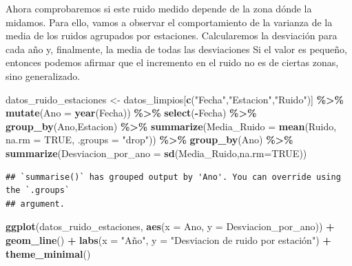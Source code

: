 \documentclass[notspecified,article,submit,moreauthors,pdftex]{Definitions/mdpi}
\newenvironment{Shaded}{\begin{snugshade}}{\end{snugshade}}
\newcommand{\AttributeTok}[1]{\textcolor[rgb]{0.13,0.29,0.53}{#1}}
\newcommand{\ConstantTok}[1]{\textcolor[rgb]{0.56,0.35,0.01}{#1}}
\newcommand{\FunctionTok}[1]{\textcolor[rgb]{0.13,0.29,0.53}{\textbf{#1}}}
\newcommand{\NormalTok}[1]{#1}
\newcommand{\OtherTok}[1]{\textcolor[rgb]{0.56,0.35,0.01}{#1}}
\newcommand{\SpecialCharTok}[1]{\textcolor[rgb]{0.81,0.36,0.00}{\textbf{#1}}}
\newcommand{\StringTok}[1]{\textcolor[rgb]{0.31,0.60,0.02}{#1}}
\begin{document}
Ahora comprobaremos si este ruido medido depende de la zona dónde la
midamos. Para ello, vamos a observar el comportamiento de la varianza de
la media de los ruidos agrupados por estaciones. Calcularemos la
desviación para cada año y, finalmente, la media de todas las
desviaciones Si el valor es pequeño, entonces podemos afirmar que el
incremento en el ruido no es de ciertas zonas, sino generalizado.

\begin{Shaded}
\begin{Highlighting}[]
\NormalTok{datos\_ruido\_estaciones }\OtherTok{\textless{}{-}}\NormalTok{ datos\_limpios[}\FunctionTok{c}\NormalTok{(}\StringTok{"Fecha"}\NormalTok{,}\StringTok{"Estacion"}\NormalTok{,}\StringTok{"Ruido"}\NormalTok{)] }\SpecialCharTok{\%\textgreater{}\%}
  \FunctionTok{mutate}\NormalTok{(}\AttributeTok{Ano =} \FunctionTok{year}\NormalTok{(Fecha)) }\SpecialCharTok{\%\textgreater{}\%}
  \FunctionTok{select}\NormalTok{(}\SpecialCharTok{{-}}\NormalTok{Fecha) }\SpecialCharTok{\%\textgreater{}\%}
  \FunctionTok{group\_by}\NormalTok{(Ano,Estacion) }\SpecialCharTok{\%\textgreater{}\%}
  \FunctionTok{summarize}\NormalTok{(}\AttributeTok{Media\_Ruido =} \FunctionTok{mean}\NormalTok{(Ruido, }\AttributeTok{na.rm =} \ConstantTok{TRUE}\NormalTok{, }\AttributeTok{.groups =} \StringTok{"drop"}\NormalTok{)) }\SpecialCharTok{\%\textgreater{}\%}
  \FunctionTok{group\_by}\NormalTok{(Ano) }\SpecialCharTok{\%\textgreater{}\%}
  \FunctionTok{summarize}\NormalTok{(}\AttributeTok{Desviacion\_por\_ano =} \FunctionTok{sd}\NormalTok{(Media\_Ruido,}\AttributeTok{na.rm=}\ConstantTok{TRUE}\NormalTok{))}
\end{Highlighting}
\end{Shaded}

\begin{verbatim}
## `summarise()` has grouped output by 'Ano'. You can override using the `.groups`
## argument.
\end{verbatim}

\begin{Shaded}
\begin{Highlighting}[]
\FunctionTok{ggplot}\NormalTok{(datos\_ruido\_estaciones, }\FunctionTok{aes}\NormalTok{(}\AttributeTok{x =}\NormalTok{ Ano, }\AttributeTok{y =}\NormalTok{ Desviacion\_por\_ano)) }\SpecialCharTok{+}
  \FunctionTok{geom\_line}\NormalTok{() }\SpecialCharTok{+}
  \FunctionTok{labs}\NormalTok{(}\AttributeTok{x =} \StringTok{"Año"}\NormalTok{, }\AttributeTok{y =} \StringTok{"Desviacion de ruido por estación"}\NormalTok{) }\SpecialCharTok{+}
  \FunctionTok{theme\_minimal}\NormalTok{() }
\end{Highlighting}
\end{Shaded}
\end{document}
